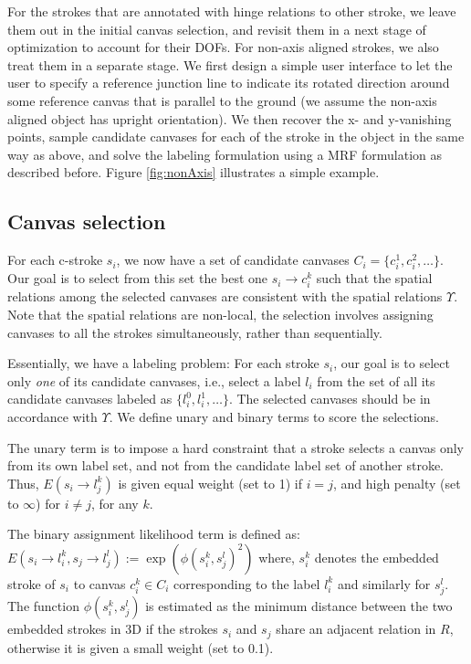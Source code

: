 For the strokes that are annotated with hinge relations to other stroke, we leave them out in the initial canvas selection, and revisit them in a next stage of optimization to account for their DOFs. For non-axis aligned strokes, we also treat them in a separate stage. We first design a simple user interface to let the user to specify a reference junction line to indicate its rotated direction around some reference canvas that is parallel to the ground (we assume the non-axis aligned object has upright orientation). We then recover the x- and y-vanishing points, sample candidate canvases for each of the stroke in the object in the same way as above, and solve the labeling formulation using a MRF formulation as described before. Figure \ref{fig:nonAxis} illustrates a simple example.

\subsection{Canvas selection}

For each c-stroke $s_i$, we now have a set of candidate canvases $C_i = \{c_i^1,c_i^2,\dots\}$. Our goal is to select from this set the best one $s_i \rightarrow c_i^k$ such that the spatial relations among the selected canvases are consistent with the spatial relations $\Upsilon$. Note that the spatial relations are non-local, the selection involves assigning canvases to all the strokes simultaneously, rather than sequentially.

Essentially, we have a labeling problem: For each stroke $s_i$, our goal is to select only {\em one} of its candidate canvases, i.e., select a label $l_i$ from the set of all its candidate canvases labeled as $\{l_i^0,l_i^1,\dots\}$. The selected canvases should be in accordance with $\Upsilon$. We define unary and binary terms to score the selections.

The unary term is to impose a hard constraint that a stroke selects a canvas only from its own label set, and not from the candidate label set of another stroke. Thus,
$E(s_i \rightarrow l_j^k)$ is given equal weight (set to 1) if $i=j$, and high penalty (set to $\infty$) for $i\ne j$, for any $k$.


The binary assignment likelihood term is defined as: $E(s_i \rightarrow l_i^k, s_j \rightarrow l_j^l):= \exp(\phi(s_i^k, s_j^l)^2)$
%
where, $s_i^k$ denotes the embedded stroke of $s_i$ to canvas $c_i^k \in C_i$ corresponding to the label $l_i^k$ and similarly for $s_j^l$. The function $\phi(s_i^k, s_j^l)$ is estimated as the minimum distance between the two embedded strokes in 3{D} if the strokes $s_i$ and $s_j$ share an adjacent relation in $R$, otherwise it is given a small weight (set to 0.1).



